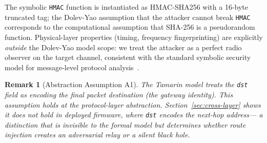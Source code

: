 \documentclass[preprint,12pt]{elsarticle}
\newtheorem{remark}{Remark}
\begin{document}
\begin{table}[H]
  \centering
  \caption{Tamarin Abstraction to LoRaMesher Implementation Mapping}
  \label{tab:tamarin-mapping}
  \setlength{\tabcolsep}{4pt}
\end{table}

\noindent
The symbolic \texttt{HMAC} function is instantiated as HMAC-SHA256 with a
16-byte truncated tag; the Dolev-Yao assumption that the attacker
cannot break \texttt{HMAC} corresponds to the computational assumption that
SHA-256 is a pseudorandom function. Physical-layer properties
(timing, frequency fingerprinting) are explicitly \emph{outside} the
Dolev-Yao model scope: we treat the attacker as a perfect radio
observer on the target channel, consistent with the standard
symbolic security model for message-level protocol analysis~\cite{basin2025-tamarin-book}.

\begin{remark}[Abstraction Assumption A1]
The Tamarin model treats the \texttt{dst} field as encoding the
\emph{final packet destination} (the gateway identity).
This assumption holds at the protocol-layer abstraction.
Section~\ref{sec:cross-layer} shows it does not hold in deployed
firmware, where \texttt{dst} encodes the \emph{next-hop address}—
a distinction that is invisible to the formal model but determines
whether route injection creates an adversarial relay or a silent
black hole.
\end{remark}
\end{document}
